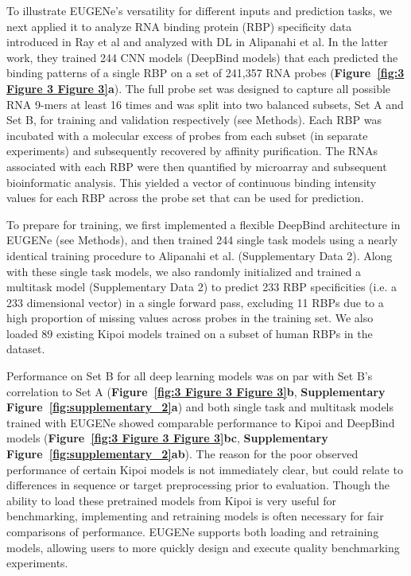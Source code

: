 To illustrate EUGENe’s versatility for different inputs and prediction tasks, we next applied it to analyze RNA binding protein (RBP) specificity data introduced in Ray et al\cite{Ray2013-yd} and analyzed with DL in Alipanahi et al\cite{Alipanahi2015-ef}. In the latter work, they trained 244 CNN models (DeepBind models) that each predicted the binding patterns of a single RBP on a set of 241,357 RNA probes (\textbf{Figure~\ref{fig:3 Figure 3 Figure 3}a}). The full probe set was designed to capture all possible RNA 9-mers at least 16 times and was split into two balanced subsets, Set A and Set B, for training and validation respectively (see Methods)\cite{Ray2013-yd}. Each RBP was incubated with a molecular excess of probes from each subset (in separate experiments) and subsequently recovered by affinity purification. The RNAs associated with each RBP were then quantified by microarray and subsequent bioinformatic analysis\cite{Berger2009-la}. This yielded a vector of continuous binding intensity values for each RBP across the probe set that can be used for prediction.

To prepare for training, we first implemented a flexible DeepBind architecture in EUGENe (see Methods), and then trained 244 single task models using a nearly identical training procedure to Alipanahi et al. (Supplementary Data 2). Along with these single task models, we also randomly initialized and trained a multitask model (Supplementary Data 2) to predict 233 RBP specificities (i.e. a 233 dimensional vector) in a single forward pass, excluding 11 RBPs due to a high proportion of missing values across probes in the training set. We also loaded 89 existing Kipoi\cite{Avsec2019-ke} models trained on a subset of human RBPs in the dataset.

Performance on Set B for all deep learning models was on par with Set B’s correlation to Set A (\textbf{Figure~\ref{fig:3 Figure 3 Figure 3}b}, \textbf{Supplementary Figure~\ref{fig:supplementary_2}a}) and both single task and multitask models trained with EUGENe showed comparable performance to Kipoi and DeepBind models (\textbf{Figure~\ref{fig:3 Figure 3 Figure 3}b}\textbf{c}, \textbf{Supplementary Figure~\ref{fig:supplementary_2}a}\textbf{b}). The reason for the poor observed performance of certain Kipoi models is not immediately clear, but could relate to differences in sequence or target preprocessing prior to evaluation. Though the ability to load these pretrained models from Kipoi is very useful for benchmarking, implementing and retraining models is often necessary for fair comparisons of performance. EUGENe supports both loading and retraining models, allowing users to more quickly design and execute quality benchmarking experiments. 

